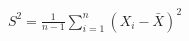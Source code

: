\documentclass[preview]{standalone}
\begin{document}
\begin{align*}
S^2 = \frac{1}{n-1} \sum_{i=1}^{n} (X_i - \bar{X})^2
\end{align*}
\end{document}
